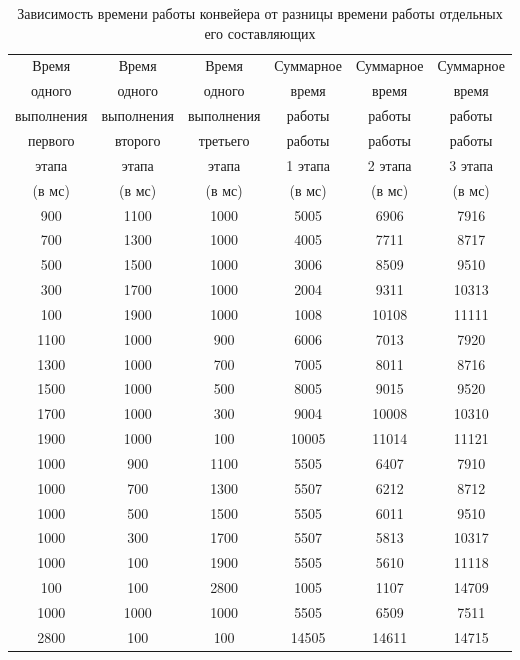 \documentclass[12pt]{report}
\begin{document}
\begin{table}[h!]
        \caption{Зависимость времени работы конвейера от разницы времени работы отдельных его составляющих}
            \begin{tabular}{ | c | c | c | c | c | c | }
                \hline
                 Время   &  Время   &  Время  &  Суммарное  & Суммарное  & Суммарное \\
                 одного   &  одного   &  одного  &  время & время &  время \\
                 выполнения   &  выполнения   &  выполнения  & работы & работы & работы  \\ 
                  первого  & второго  & третьего  & работы  & работы & работы  \\ 
                 этапа & этапа & этапа & 1 этапа & 2 этапа & 3 этапа  \\ 
                 (в мс) & (в мс) & (в мс) & (в мс) & (в мс) & (в мс)  \\ 
                 \hline  
                900 & 1100 & 1000 & 5005 & 6906 & 7916  \\
                700 & 1300 & 1000 & 4005 & 7711 & 8717  \\
                500 & 1500 & 1000 & 3006 & 8509 & 9510  \\
                300 & 1700 & 1000 & 2004 & 9311 & 10313 \\
                100 & 1900 & 1000 & 1008 & 10108& 11111 \\
                
                1100 & 1000 & 900 & 6006 & 7013 & 7920  \\
                1300 & 1000 & 700 & 7005 & 8011 & 8716  \\
                1500 & 1000 & 500 & 8005 & 9015 & 9520  \\
                1700 & 1000 & 300 & 9004 & 10008& 10310 \\
                1900 & 1000 & 100 & 10005& 11014& 11121 \\
                
                1000 & 900 & 1100 & 5505 & 6407 & 7910  \\
                1000 & 700 & 1300 & 5507 & 6212 & 8712  \\
                1000 & 500 & 1500 & 5505 & 6011 & 9510  \\
                1000 & 300 & 1700 & 5507 & 5813 & 10317 \\
                1000 & 100 & 1900 & 5505 & 5610 & 11118 \\
                
                100  & 100 & 2800 & 1005 & 1107 & 14709 \\
                1000 & 1000& 1000 & 5505 & 6509 & 7511  \\
                2800 & 100 & 100  & 14505& 14611& 14715 \\
               
                \hline
            \end{tabular}
        \label{tab:a_b_c}
    \end{table} 
	
\end{document}
